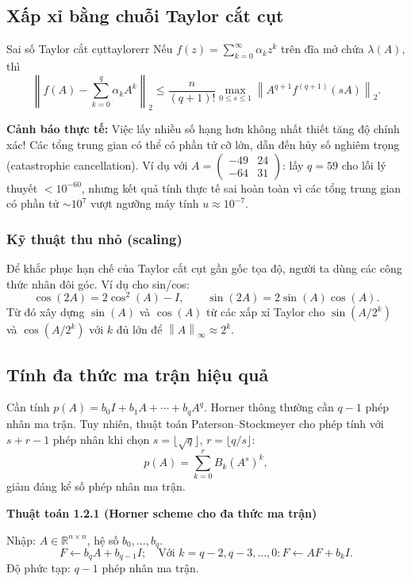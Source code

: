 \documentclass[12pt,a4paper]{report}
\newcommand{\R}{\mathbb{R}}
\newcommand{\norm}[1]{\left\lVert #1 \right\rVert}
\begin{document}
\subsection{Xấp xỉ bằng chuỗi Taylor cắt cụt}

\begin{theorem}{Sai số Taylor cắt cụt}{taylorerr}
Nếu $f(z) = \sum_{k=0}^\infty \alpha_k z^k$ trên đĩa mở chứa $\lambda(A)$, thì
\[
  \left\| f(A) - \sum_{k=0}^{q} \alpha_k A^k \right\|_2
  \le \frac{n}{(q+1)!} \max_{0 \le s \le 1}
      \norm{A^{q+1} f^{(q+1)}(sA)}_2.
\]
\end{theorem}

\begin{importantbox}
\textbf{Cảnh báo thực tế:} Việc lấy nhiều số hạng hơn không nhất thiết tăng độ chính
xác! Các tổng trung gian có thể có phần tử cỡ lớn, dẫn đến hủy số nghiêm trọng
(catastrophic cancellation). Ví dụ với
$A = \begin{pmatrix} -49 & 24 \\ -64 & 31 \end{pmatrix}$:
lấy $q=59$ cho lỗi lý thuyết $<10^{-60}$, nhưng kết quả tính thực tế sai hoàn toàn
vì các tổng trung gian có phần tử $\sim 10^7$ vượt ngưỡng máy tính $u \approx 10^{-7}$.
\end{importantbox}

\subsubsection{Kỹ thuật thu nhỏ (scaling)}

Để khắc phục hạn chế của Taylor cắt cụt gần gốc tọa độ, người ta dùng các công thức
nhân đôi góc. Ví dụ cho sin/cos:
\[
  \cos(2A) = 2\cos^2(A) - I, \qquad \sin(2A) = 2\sin(A)\cos(A).
\]
Từ đó xây dựng $\sin(A)$ và $\cos(A)$ từ các xấp xỉ Taylor cho $\sin(A/2^k)$ và
$\cos(A/2^k)$ với $k$ đủ lớn để $\norm{A}_\infty \approx 2^k$.

\subsection{Tính đa thức ma trận hiệu quả}

Cần tính $p(A) = b_0 I + b_1 A + \cdots + b_q A^q$. Horner thông thường cần $q-1$
phép nhân ma trận. Tuy nhiên, thuật toán Paterson--Stockmeyer cho phép tính với
$s + r - 1$ phép nhân khi chọn $s = \lfloor\sqrt{q}\rfloor$, $r = \lfloor q/s \rfloor$:
\[
  p(A) = \sum_{k=0}^{r} B_k (A^s)^k,
\]
giảm đáng kể số phép nhân ma trận.

\begin{algobox}
\textbf{Thuật toán 1.2.1 (Horner scheme cho đa thức ma trận)}

\medskip
Nhập: $A \in \R^{n\times n}$, hệ số $b_0,\ldots,b_q$.
\[
  F \leftarrow b_q A + b_{q-1}I; \quad
  \text{Với } k = q-2, q-3, \ldots, 0: F \leftarrow AF + b_k I.
\]
Độ phức tạp: $q-1$ phép nhân ma trận.
\end{algobox}
\end{document}
